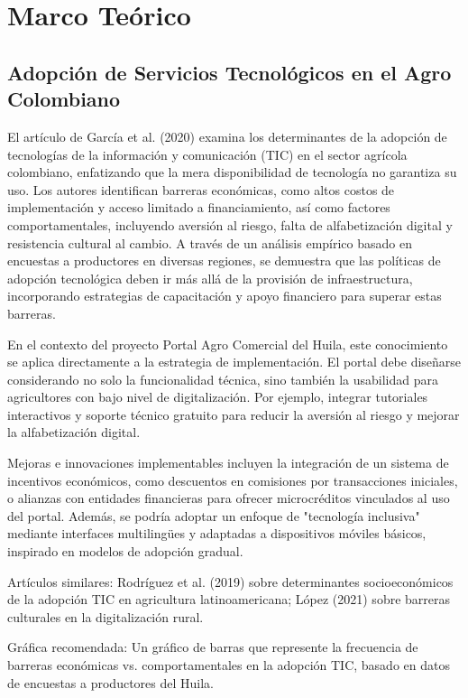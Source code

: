 \section{Marco Teórico}

\subsection{Adopción de Servicios Tecnológicos en el Agro Colombiano}

El artículo de García et al. (2020) examina los determinantes de la adopción de tecnologías de la información y comunicación (TIC) en el sector agrícola colombiano, enfatizando que la mera disponibilidad de tecnología no garantiza su uso. Los autores identifican barreras económicas, como altos costos de implementación y acceso limitado a financiamiento, así como factores comportamentales, incluyendo aversión al riesgo, falta de alfabetización digital y resistencia cultural al cambio. A través de un análisis empírico basado en encuestas a productores en diversas regiones, se demuestra que las políticas de adopción tecnológica deben ir más allá de la provisión de infraestructura, incorporando estrategias de capacitación y apoyo financiero para superar estas barreras.

En el contexto del proyecto Portal Agro Comercial del Huila, este conocimiento se aplica directamente a la estrategia de implementación. El portal debe diseñarse considerando no solo la funcionalidad técnica, sino también la usabilidad para agricultores con bajo nivel de digitalización. Por ejemplo, integrar tutoriales interactivos y soporte técnico gratuito para reducir la aversión al riesgo y mejorar la alfabetización digital.

Mejoras e innovaciones implementables incluyen la integración de un sistema de incentivos económicos, como descuentos en comisiones por transacciones iniciales, o alianzas con entidades financieras para ofrecer microcréditos vinculados al uso del portal. Además, se podría adoptar un enfoque de "tecnología inclusiva" mediante interfaces multilingües y adaptadas a dispositivos móviles básicos, inspirado en modelos de adopción gradual.

Artículos similares: Rodríguez et al. (2019) sobre determinantes socioeconómicos de la adopción TIC en agricultura latinoamericana; López (2021) sobre barreras culturales en la digitalización rural.

Gráfica recomendada: Un gráfico de barras que represente la frecuencia de barreras económicas vs. comportamentales en la adopción TIC, basado en datos de encuestas a productores del Huila.

